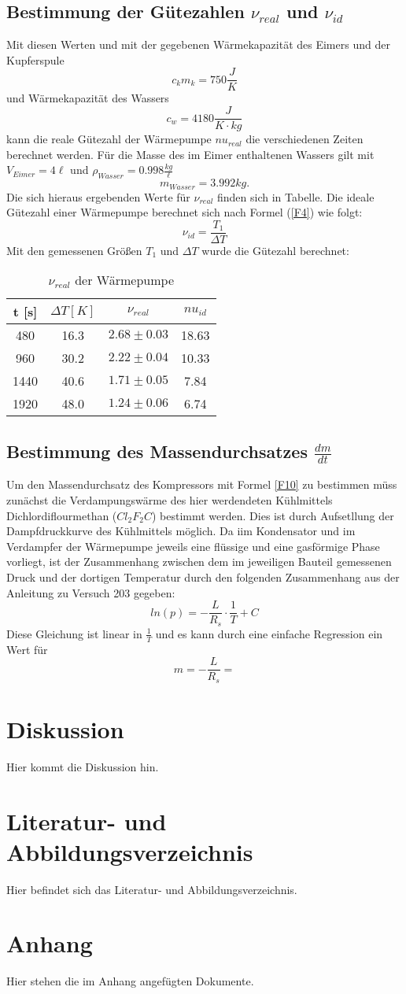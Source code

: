 \documentclass[11pt]{article}
\begin{document}
\subsection{Bestimmung der Gütezahlen $\nu_{real}$ und $\nu_{id}$}
\noindent Mit diesen Werten und mit der gegebenen Wärmekapazität des Eimers und der Kupferspule
\[c_km_k = 750\frac{J}{K}\]
und Wärmekapazität des Wassers 
\[c_w = 4180 \frac{J}{K\cdot kg}\]
kann die reale Gütezahl der Wärmepumpe $nu_{real}$ die verschiedenen Zeiten berechnet werden. Für die Masse des im Eimer enthaltenen Wassers gilt mit $V_{Eimer} = 4 \ell$ und $\rho_{Wasser} =0.998 \frac{kg}{\ell}$
\[m_{Wasser} = 3.992kg. \]
Die sich hieraus ergebenden Werte für $\nu_{real}$ finden sich in Tabelle.
Die ideale Gütezahl einer Wärmepumpe berechnet sich nach Formel (\ref{F4}) wie folgt:
\begin{equation}
\nu_{id} = \frac{T_1}{\Delta T}
\end{equation}
Mit den gemessenen Größen $T_1$ und $\Delta T$ wurde die Gütezahl berechnet:
\begin{table}[H]
\centering
\begin{tabular}{c|c|c|c}

t [s] & $\Delta T [K]$ & $\nu_{real}$ & $nu_{id}$ \\
\hline
480  & 16.3 &$ 2.68\pm0.03$ & 18.63\\
960  & 30.2 &$ 2.22\pm0.04$ & 10.33\\
1440 & 40.6 &$ 1.71\pm0.05$ &  7.84\\
1920 & 48.0 &$ 1.24\pm0.06$ &  6.74\\

\end{tabular}
\label{guetewerte}
\caption{$\nu_{real}$ der Wärmepumpe}
\end{table} 
\subsection{Bestimmung des Massendurchsatzes $\frac{dm}{dt}$}
Um den Massendurchsatz des Kompressors mit Formel \ref{F10} zu bestimmen müss zunächst die Verdampungswärme des hier werdendeten Kühlmittels Dichlordiflourmethan ($Cl_2F_2C$) bestimmt werden. Dies ist durch Aufsetllung der Dampfdruckkurve des Kühlmittels möglich. Da iim Kondensator und im Verdampfer der Wärmepumpe jeweils eine flüssige und eine gasförmige Phase vorliegt, ist der Zusammenhang zwischen dem im jeweiligen Bauteil gemessenen Druck und der dortigen Temperatur durch den folgenden Zusammenhang aus der Anleitung zu Versuch 203 gegeben:
\begin{equation}
ln(p)= - \frac{L}{R_s} \cdot \frac{1}{T} + C
\end{equation}
Diese Gleichung ist linear in $\frac{1}{T}$ und es kann durch eine einfache Regression ein Wert für
\[m = -\frac{L}{R_s} = \]
 
\section{Diskussion}
Hier kommt die Diskussion hin.
\section{Literatur- und Abbildungsverzeichnis}
Hier befindet sich das Literatur- und Abbildungsverzeichnis.
\section{Anhang}
Hier stehen die im Anhang angefügten Dokumente.
\end{document}
